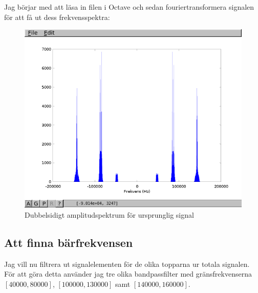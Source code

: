 \documentclass[10pt]{article}
\begin{document}
Jag börjar med att läsa in filen i Octave och sedan fouriertransformera signalen för att få ut dess frekvensspektra: 

\begin{figure}[htp]
  \begin{center}
  \includegraphics[keepaspectratio=true,width=\linewidth]{fft_orig_data.png}  %
  \end{center}
  \caption{Dubbelsidigt amplitudspektrum för ursprunglig signal} %
  \label{fig:fft_orig_data}
\end{figure}
\newpage

\subsection{Att finna bärfrekvensen}

Jag vill nu filtrera ut signalelementen för de olika topparna ur totala signalen. För att göra detta använder jag tre olika bandpassfilter med gränsfrekvenserna $[40000, 80000]$, $[100000, 130000]$ samt $[140000, 160000]$.
\end{document}
